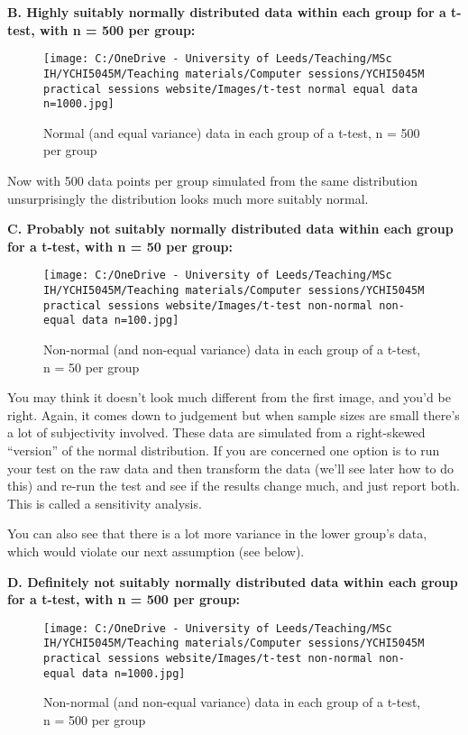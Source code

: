 \documentclass[
]{book}
\begin{document}
\textbf{B. Highly suitably normally distributed data within each group for a t-test, with n = 500 per group:}

\begin{figure}
\centering
\texttt{[image: C:/OneDrive - University of Leeds/Teaching/MSc IH/YCHI5045M/Teaching materials/Computer sessions/YCHI5045M practical sessions website/Images/t-test normal equal data n=1000.jpg]}
\caption{Normal (and equal variance) data in each group of a t-test, n = 500 per group}
\end{figure}

Now with 500 data points per group simulated from the same distribution unsurprisingly the distribution looks much more suitably normal.

\textbf{C. Probably not suitably normally distributed data within each group for a t-test, with n = 50 per group:}

\begin{figure}
\centering
\texttt{[image: C:/OneDrive - University of Leeds/Teaching/MSc IH/YCHI5045M/Teaching materials/Computer sessions/YCHI5045M practical sessions website/Images/t-test non-normal non-equal data n=100.jpg]}
\caption{Non-normal (and non-equal variance) data in each group of a t-test, n = 50 per group}
\end{figure}

You may think it doesn't look much different from the first image, and you'd be right. Again, it comes down to judgement but when sample sizes are small there's a lot of subjectivity involved. These data are simulated from a right-skewed ``version'' of the normal distribution. If you are concerned one option is to run your test on the raw data and then transform the data (we'll see later how to do this) and re-run the test and see if the results change much, and just report both. This is called a sensitivity analysis.

You can also see that there is a lot more variance in the lower group's data, which would violate our next assumption (see below).

\textbf{D. Definitely not suitably normally distributed data within each group for a t-test, with n = 500 per group:}

\begin{figure}
\centering
\texttt{[image: C:/OneDrive - University of Leeds/Teaching/MSc IH/YCHI5045M/Teaching materials/Computer sessions/YCHI5045M practical sessions website/Images/t-test non-normal non-equal data n=1000.jpg]}
\caption{Non-normal (and non-equal variance) data in each group of a t-test, n = 500 per group}
\end{figure}
\end{document}
